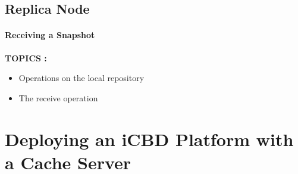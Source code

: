 \subsection{Replica Node}
\label{sub:impl_icbdrep_replica_node}

\paragraph{Receiving a Snapshot}
\label{par:impl_receive_snap}

\textbf{TOPICS :}
\begin{itemize}
	\item Operations on the local repository
	\item The receive operation
\end{itemize}




\section{Deploying an iCBD Platform with a Cache Server}
\label{sec:impl_cache_server}



